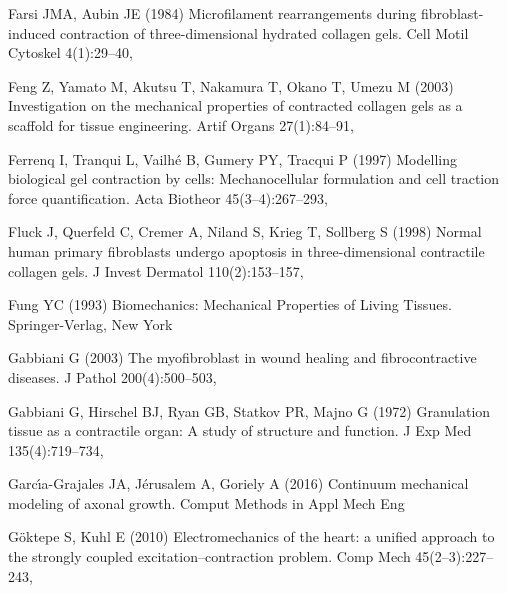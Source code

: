 \begin{thebibliography}{124}
Farsi JMA, Aubin JE (1984) Microfilament rearrangements during
  fibroblast-induced contraction of three-dimensional hydrated collagen gels.
  Cell Motil Cytoskel 4(1):29--40, 

Feng Z, Yamato M, Akutsu T, Nakamura T, Okano T, Umezu M (2003) Investigation
  on the mechanical properties of contracted collagen gels as a scaffold for
  tissue engineering. Artif Organs 27(1):84--91,

Ferrenq I, Tranqui L, Vailh{\'e} B, Gumery PY, Tracqui P (1997) Modelling
  biological gel contraction by cells: Mechanocellular formulation and cell
  traction force quantification. Acta Biotheor 45(3--4):267--293,

Fluck J, Querfeld C, Cremer A, Niland S, Krieg T, Sollberg S (1998) Normal
  human primary fibroblasts undergo apoptosis in three-dimensional contractile
  collagen gels. J Invest Dermatol 110(2):153--157,

Fung YC (1993) Biomechanics: Mechanical Properties of Living Tissues.
  Springer-Verlag, New York

Gabbiani G (2003) The myofibroblast in wound healing and fibrocontractive
  diseases. J Pathol 200(4):500--503, 

Gabbiani G, Hirschel BJ, Ryan GB, Statkov PR, Majno G (1972) Granulation tissue
  as a contractile organ: A study of structure and function. J Exp Med
  135(4):719--734, 

Garc{\'\i}a-Grajales JA, J{\'e}rusalem A, Goriely A (2016) Continuum mechanical
  modeling of axonal growth. Comput Methods in Appl Mech Eng

G{\"o}ktepe S, Kuhl E (2010) Electromechanics of the heart: a unified approach
  to the strongly coupled excitation--contraction problem. Comp Mech
  45(2--3):227--243, 


\end{thebibliography}
